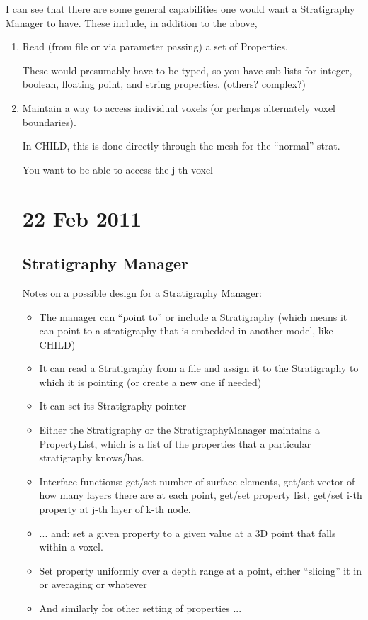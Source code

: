 \documentclass[12pt]{amsart}
\begin{document}
I can see that there are some general capabilities one would want a Stratigraphy Manager to have. These include, in addition to the above,
\begin{enumerate}

  \item Read (from file or via parameter passing) a set of Properties.
  
  These would presumably have to be typed, so you have sub-lists for integer, boolean, floating point, and string properties. (others? complex?)
  
  \item Maintain a way to access individual voxels (or perhaps alternately voxel boundaries). 
  
  In CHILD, this is done directly through the mesh for the ``normal'' strat.
  
  You want to be able to access the j-th voxel 
  
\section{22 Feb 2011}
\subsection{Stratigraphy Manager}

Notes on a possible design for a Stratigraphy Manager:
\begin{itemize}
\item The manager can ``point to'' or include a Stratigraphy (which means it can point to a stratigraphy that is embedded in another model, like CHILD)
\item It can read a Stratigraphy from a file and assign it to the Stratigraphy to which it is pointing (or create a new one if needed)
\item It can set its Stratigraphy pointer
\item Either the Stratigraphy or the StratigraphyManager maintains a PropertyList, which is a list of the properties that a particular stratigraphy knows/has.
\item Interface functions: get/set number of surface elements, get/set vector of how many layers there are at each point, get/set property list, get/set i-th property at j-th layer of k-th node.
\item ... and: set a given property to a given value at a 3D point that falls within a voxel. 
\item Set property uniformly over a depth range at a point, either ``slicing'' it in or averaging or whatever
\item And similarly for other setting of properties ...
\end{itemize}


\end{enumerate}
\end{document}
